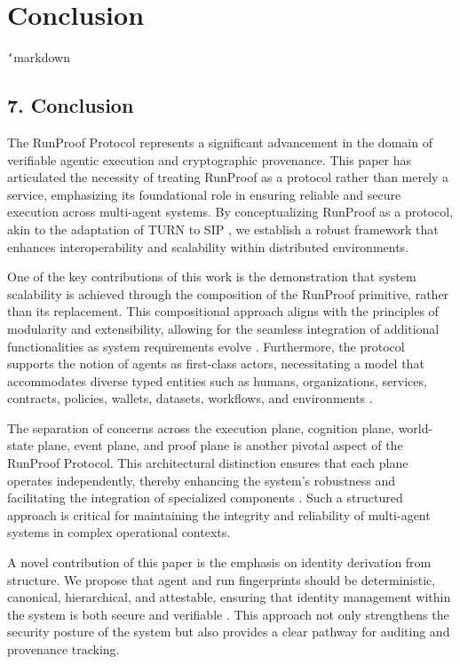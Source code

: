 \documentclass[11pt]{article}
\begin{document}
\section{Conclusion}
\texttt{`}markdown
\subsection{7. Conclusion}

The RunProof Protocol represents a significant advancement in the domain of verifiable agentic execution and cryptographic provenance. This paper has articulated the necessity of treating RunProof as a protocol rather than merely a service, emphasizing its foundational role in ensuring reliable and secure execution across multi-agent systems. By conceptualizing RunProof as a protocol, akin to the adaptation of TURN to SIP \cite{Guezouri2010}, we establish a robust framework that enhances interoperability and scalability within distributed environments.

One of the key contributions of this work is the demonstration that system scalability is achieved through the composition of the RunProof primitive, rather than its replacement. This compositional approach aligns with the principles of modularity and extensibility, allowing for the seamless integration of additional functionalities as system requirements evolve \cite{Li2025}. Furthermore, the protocol supports the notion of agents as first-class actors, necessitating a model that accommodates diverse typed entities such as humans, organizations, services, contracts, policies, wallets, datasets, workflows, and environments \cite{Moslemi2026}.

The separation of concerns across the execution plane, cognition plane, world-state plane, event plane, and proof plane is another pivotal aspect of the RunProof Protocol. This architectural distinction ensures that each plane operates independently, thereby enhancing the system's robustness and facilitating the integration of specialized components \cite{Sharma2025}. Such a structured approach is critical for maintaining the integrity and reliability of multi-agent systems in complex operational contexts.

A novel contribution of this paper is the emphasis on identity derivation from structure. We propose that agent and run fingerprints should be deterministic, canonical, hierarchical, and attestable, ensuring that identity management within the system is both secure and verifiable \cite{Bhat2018}. This approach not only strengthens the security posture of the system but also provides a clear pathway for auditing and provenance tracking.
\end{document}
